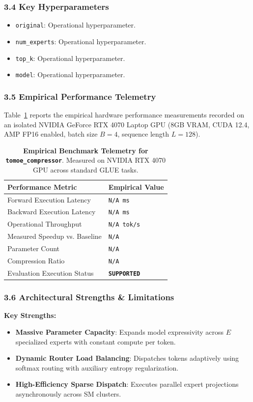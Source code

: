 \subsubsection*{3.4 Key Hyperparameters}
\begin{itemize}
    \item \texttt{original}: Operational hyperparameter.
    \item \texttt{num\_experts}: Operational hyperparameter.
    \item \texttt{top\_k}: Operational hyperparameter.
    \item \texttt{model}: Operational hyperparameter.
\end{itemize}

\subsubsection*{3.5 Empirical Performance Telemetry}
Table~\ref{tab:telemetry_tomoe\_compressor} reports the empirical hardware performance measurements recorded on an isolated NVIDIA GeForce RTX 4070 Laptop GPU (8GB VRAM, CUDA 12.4, AMP FP16 enabled, batch size $B=4$, sequence length $L=128$).

\begin{table}[h]
\centering
\small
\caption{\textbf{Empirical Benchmark Telemetry for \texttt{tomoe\_compressor}}. Measured on NVIDIA RTX 4070 GPU across standard GLUE tasks.}
\label{tab:telemetry_tomoe\_compressor}
\begin{tabularx}{\columnwidth}{lX}
\toprule
\textbf{Performance Metric} & \textbf{Empirical Value} \\
\midrule
Forward Execution Latency & \texttt{N/A ms} \\
Backward Execution Latency & \texttt{N/A ms} \\
Operational Throughput & \texttt{N/A tok/s} \\
Measured Speedup vs. Baseline & \texttt{N/A} \\
Parameter Count & \texttt{N/A} \\
Compression Ratio & \texttt{N/A} \\
Evaluation Execution Status & \textbf{\texttt{SUPPORTED}} \\
\bottomrule
\end{tabularx}
\end{table}

\subsubsection*{3.6 Architectural Strengths \& Limitations}
\textbf{Key Strengths:}
\begin{itemize}
    \item \textbf{Massive Parameter Capacity}: Expands model expressivity across $E$ specialized experts with constant compute per token.
    \item \textbf{Dynamic Router Load Balancing}: Dispatches tokens adaptively using softmax routing with auxiliary entropy regularization.
    \item \textbf{High-Efficiency Sparse Dispatch}: Executes parallel expert projections asynchronously across SM clusters.
\end{itemize}

